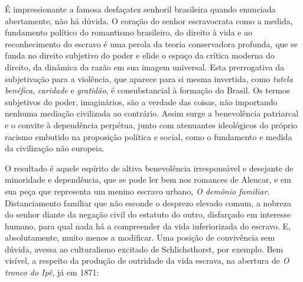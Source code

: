 É impressionante a famosa desfaçatez senhoril brasileira quando
enunciada abertamente, não há dúvida. O coração do senhor escravocrata
como a medida, fundamento político do romantismo brasileiro, do direito
à vida e ao reconhecimento do escravo é uma perola da teoria
conservadora profunda, que se funda no direito subjetivo do poder e
elide o espaço da crítica moderna do direito, da dinâmica da razão em
sua imagem universal. Esta prerrogativa da subjetivação para a
violência, que aparece para si mesma invertida, como \emph{tutela
benéfica}, \emph{caridade} e \emph{gratidão}, é consubstancial à
formação do Brasil. Os termos subjetivos do poder, imaginários, são a
verdade das coisas, não importando nenhuma mediação civilizada ao
contrário. Assim surge a benevolência patriarcal e o convite à
dependência perpétua, junto com atenuantes ideológicos do próprio
racismo embutido na proposição política e social, como o fundamento e
medida da civilização não europeia.

O resultado é aquele espírito de altiva benevolência irresponsável e
desejante de minoridade e dependência, que se pode ler bem nos romances
de Alencar, e em sua peça que representa um menino escravo urbano,
\emph{O demônio familiar.} Distanciamento familiar que não esconde o
desprezo elevado comum, a nobreza do senhor diante da negação civil do
estatuto do outro, disfarçado em interesse humano, para qual nada há a
compreender da vida inferiorizada do escravo. E, absolutamente, muito
menos a modificar. Uma posição de convivência sem dúvida, avessa ao
culturalismo excitado de Schlichsthorst, por exemplo. Bem visível, a
respeito da produção de outridade da vida escrava, na abertura de
\emph{O tronco do Ipê}, já em 1871:


